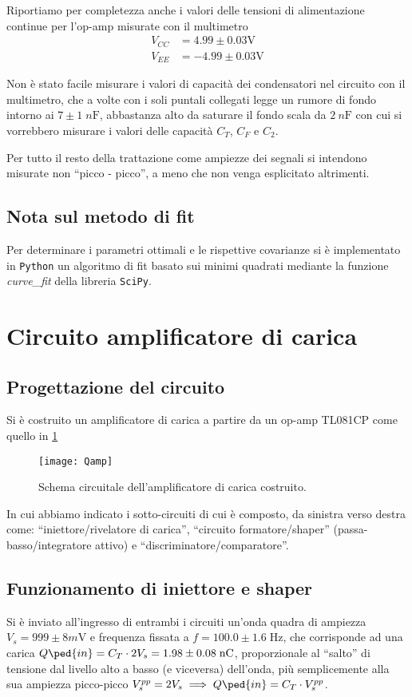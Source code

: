 \documentclass[10pt, a4paper, italian]{article}
\begin{document}
Riportiamo per completezza anche i valori delle tensioni di alimentazione
continue per l'op-amp misurate con il multimetro
\begin{align*}
V_{CC} &= 4.99 \pm 0.03 \si{\V} \\
V_{EE} &= -4.99 \pm 0.03 \si{\V}
\end{align*}

Non è stato facile misurare i valori di capacità dei condensatori nel
circuito con il multimetro, che a volte con i soli puntali collegati legge
un rumore di fondo intorno ai $7 \pm 1 \; \si{n\F}$, abbastanza alto da
saturare il fondo scala da $\SI{2}{n\F}$ con cui si vorrebbero misurare i
valori delle capacità $C_T$, $C_F$ e $C_2$.

Per tutto il resto della trattazione come ampiezze dei segnali si intendono
misurate non ``picco - picco'', a meno che non venga esplicitato altrimenti.

\subsection*{Nota sul metodo di fit}
Per determinare i parametri ottimali e le rispettive covarianze si \`e
implementato in \verb+Python+ un algoritmo di fit basato sui minimi quadrati
mediante la funzione \emph{curve\_fit} della libreria \texttt{SciPy}.

\section{Circuito amplificatore di carica}
\subsection{Progettazione del circuito}
Si è costruito un amplificatore di carica a partire da un op-amp TL081CP come
quello in \cref{fig: Qampschm}

\begin{figure}[htbp]
    \centering
	\texttt{[image: Qamp]}
    \caption{Schema circuitale dell'amplificatore di carica costruito.
    \label{fig: Qampschm}}
\end{figure}

In cui abbiamo indicato i sotto-circuiti di cui è composto, da sinistra verso
destra come: ``iniettore/rivelatore di carica'', ``circuito formatore/shaper''
(passa-basso/integratore attivo) e ``discriminatore/comparatore''.

\subsection{Funzionamento di iniettore e shaper}
Si è inviato all'ingresso di entrambi i circuiti un'onda quadra di
ampiezza $V_s = 999 \pm 8 \si{m\V}$ e frequenza fissata a
$f = 100.0 \pm 1.6 \; \si{\Hz}$, che corrisponde ad una carica
$Q\ped{in} = C_T \cdot 2V_s = 1.98 \pm 0.08 \; \si{n\coulomb}$, proporzionale
al ``salto'' di tensione dal livello alto a basso (e viceversa) dell'onda,
più semplicemente alla sua ampiezza picco-picco
$V_s^{pp} = 2 V_s \implies Q\ped{in} = C_T \cdot V_s^{pp}$.
\end{document}
